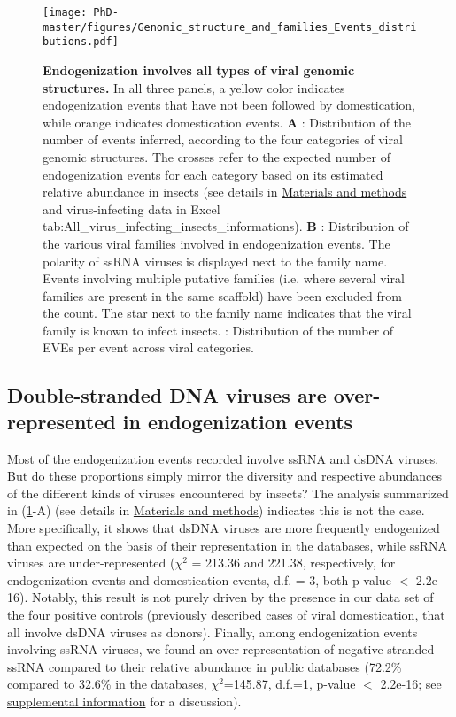 \begin{figure}[!htbp]
 \centering
  \texttt{[image: PhD-master/figures/Genomic\_structure\_and\_families\_Events\_distributions.pdf]}
\caption[Paper1:Distribution of Events and dEvents among viral genomic structures and viral families]{\textbf{Endogenization involves all types of viral genomic structures.} In all three panels, a yellow color indicates endogenization events that have not been followed by domestication, while orange indicates domestication events. \textbf{A} : Distribution of the number of events inferred, according to the four categories of viral genomic structures. The crosses refer to the expected number of endogenization events for each category based on its estimated relative abundance in insects (see details in \hyperref[sec:MM-8]{Materials and methods} and virus-infecting data in Excel tab:All\_virus\_infecting\_insects\_informations).  \textbf{B} :  Distribution of the various viral families involved in endogenization events. The polarity of ssRNA viruses  is displayed next to the family name. Events involving multiple putative families (i.e. where several viral families are present in the same scaffold) have been excluded from the count. The star next to the family name indicates that the viral family is known to infect insects. \textbf{} : Distribution of the number of EVEs per event across viral categories.}
\label{figure:Genomic_structure_and_families_Events_distributions}
\end{figure}

\subsection{Double-stranded DNA viruses are over-represented in endogenization events}

Most of the endogenization events recorded involve ssRNA and dsDNA viruses. But do these proportions simply mirror the diversity and respective abundances of the different kinds of viruses encountered by insects?  The analysis summarized in (\figurename{\ref{figure:Genomic_structure_and_families_Events_distributions}}-A) (see details in \hyperref[sec:MM-8]{Materials and methods}) indicates this is not the case. More specifically, it shows that dsDNA viruses are more frequently endogenized than expected on the basis of their representation in the databases, while ssRNA viruses are under-represented  ($\chi^2$ = 213.36 and 221.38, respectively, for endogenization events and domestication events, d.f. = 3, both p-value $<$ 2.2e-16). Notably, this result is not purely driven by the presence in our data set of the four positive controls (previously described cases of viral domestication, that all involve dsDNA viruses as donors). Finally, among endogenization events involving ssRNA viruses, we found an over-representation of negative stranded ssRNA compared to their relative abundance in public databases (72.2\% compared to 32.6\% in the databases, $\chi^2$=145.87, d.f.=1, p-value $<$ 2.2e-16; see \hyperref[sec:SI-1]{supplemental information} for a discussion).\\

